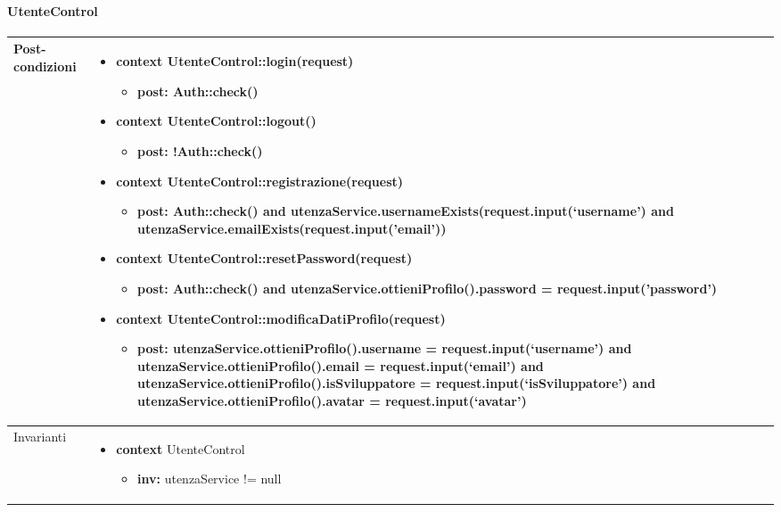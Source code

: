 \paragraph{UtenteControl}
\small\begin{tabular}{|| l | p{28em} ||} 
	\hline
	Post-condizioni & \begin{itemize}
		\item \textbf{context} UtenteControl::login(request)
		\begin{itemize}
			\item[ ] \textbf{post:} Auth::check()
		\end{itemize}
	  
	    \item \textbf{context} UtenteControl::logout()
		\begin{itemize}
			\item[ ] \textbf{post:} !Auth::check()
		\end{itemize} 
	  
	    \item \textbf{context} UtenteControl::registrazione(request) 
		\begin{itemize}
			\item[ ] \textbf{post:} Auth::check() and utenzaService.usernameExists(request.input(‘username’) and utenzaService.emailExists(request.input('email'))
		\end{itemize} 
	  
	    \item \textbf{context} UtenteControl::resetPassword(request) 
		\begin{itemize}
			\item[ ] \textbf{post:} Auth::check() and utenzaService.ottieniProfilo().password = request.input('password')
		\end{itemize} 

	    \item \textbf{context} UtenteControl::modificaDatiProfilo(request) 
		\begin{itemize}
			\item[ ] \textbf{post:} utenzaService.ottieniProfilo().username = request.input(‘username’) and utenzaService.ottieniProfilo().email = request.input(‘email’) and utenzaService.ottieniProfilo().isSviluppatore = request.input(‘isSviluppatore’) and utenzaService.ottieniProfilo().avatar = request.input(‘avatar’)
		\end{itemize} 
	\end{itemize}\\
	\hline
	Invarianti & \begin{itemize}
		\item \textbf{context} UtenteControl
		\begin{itemize}
			\item[ ] \textbf{inv:} utenzaService != null
		\end{itemize}
	\end{itemize}\\
	\hline
	\end{tabular}

